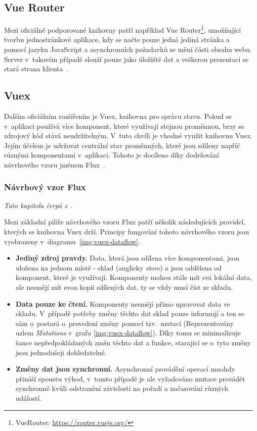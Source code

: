 \subsection{Vue Router}
Mezi oficiálně podporované knihovny patří například Vue Router\footnote{VueRouter: \url{https://router.vuejs.org/}}, umožňující tvorbu jednostránkové aplikace, kdy se načte pouze jedná jediná stránka a pomocí jazyku JavaScript a asynchronních požadavků se mění části obsahu webu. Server v~takovém případě slouží pouze jako úložiště dat a veškerou prezentaci se stará strana klienta~\cite{bib:vue-router}. %


\subsection{Vuex}
Dalším oficiálním rozšířením je Vuex, knihovna pro správu stavu. Pokud se v~aplikaci používá více komponent, které využívají stejnou proměnnou, brzy se zdrojový kód stává neudržitelným. 
V~tuto chvíli je vhodné využit knihovnu Vuex. Jejím účelem je udržovat centrální stav proměnných, které jsou sdíleny napříč různými komponentami v~aplikaci. Tohoto je docíleno díky dodržování návrhového vzoru jménem Flux~\cite{bib:vuex-doc}. 


\subsubsection*{Návrhový vzor Flux}
\emph{Tato kapitola čerpá z~\cite{bib:vuex-guide}}.

Mezi základní pilíře návrhového vzoru Flux patří několik následujících pravidel, kterých se knihovna Vuex drží. Principy fungování tohoto návrhového vzoru jsou vyobrazeny v~diagramu~\ref{img:vuex-dataflow}.

\begin{itemize}
    \item \textbf{Jediný zdroj pravdy.} Data, která jsou sdílena více komponentami, jsou uložena na jednom místě - sklad (anglicky \emph{store}) a jsou oddělena od komponent, které je využívají. Komponenty mohou stále mít svá lokální data, ale nesmějí mít svou kopií sdílených dat, ty se vždy musí číst ze skladu.
    \item \textbf{Data pouze ke čtení.} Komponenty nesmějí přímo upravovat data ve skladu. V~případě potřeby změny těchto dat sklad pouze informují a ten se sám o~postará o~provedení změny pomocí tzv.~mutací (Reprezentovány uzlem \emph{Mutations} v~grafu \ref{img:vuex-dataflow}). Díky tomu se minimalizuje šance nepředpokládaných změn těchto dat a funkce, starající se o~tyto změny jsou jednodušeji dohledatelné.
    \item \textbf{Změny dat jsou synchronní.} Asynchronní provádění operací mnohdy přináší spoustu výhod, v~tomto případě je ale vyžadováno mutace provádět synchronně kvůli odstranění závislosti na pořadí a načasování různých událostí.
\end{itemize}

